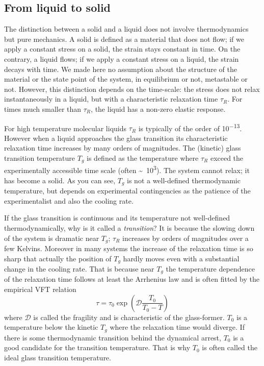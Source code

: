 \subsection{From liquid to solid}
\label{sec:liquid_solid}

The distinction between a solid and a liquid does not involve thermodynamics but pure mechanics. A solid is defined as a material that does not flow; if we apply a constant stress on a solid, the strain stays constant in time. On the contrary, a liquid flows; if we apply a constant stress on a liquid, the strain decays with time. We made here no assumption about the structure of the material or the state point of the system, in equilibrium or not, metastable or not. However, this distinction depends on the time-scale: the stress does not relax instantaneously in a liquid, but with a characteristic relaxation time $\tau_R$. For times much smaller than $\tau_R$, the liquid has a non-zero elastic response.

For high temperature molecular liquids $\tau_R$ is typically of the order of \unit{10^{-13}}{\second}. However when a liquid approaches the glass transition its characteristic relaxation time increases by many orders of magnitudes. The (kinetic) glass transition temperature $T_g$ is defined as the temperature where $\tau_R$ exceed the experimentally accessible time scale (often \unit{\sim 10^3}{\second}). The system cannot relax; it has become a solid. As you can see, $T_g$ is not a well-defined thermodynamic temperature, but depends on experimental contingencies as the patience of the experimentalist and also the cooling rate.

If the glass transition is continuous and its temperature not well-defined thermodynamically, why is it called a \emph{transition}? It is because the slowing down of the system is dramatic near $T_g$; $\tau_R$ increases by orders of magnitudes over a few Kelvins. Moreover in many systems the increase of the relaxation time is so sharp that actually the position of $T_g$ hardly moves even with a substantial change in the cooling rate. That is because near $T_g$ the temperature dependence of the relaxation time follows at least the Arrhenius law and is often fitted by the empirical \ac{VFT} relation~\citep{Vogel1921, Fulcher1925, Tammann1926}
\begin{equation}
	\tau = \tau_0 \exp{\left(\mathcal{D}\frac{T_0}{T_0-T}\right)}
	\label{eq:VFT}
\end{equation}
where $\mathcal{D}$ is called the fragility and is characteristic of the glass-former. $T_0$ is a temperature below the kinetic $T_g$ where the relaxation time would diverge. If there is some thermodynamic transition behind the dynamical arrest, $T_0$ is a good candidate for the transition temperature. That is why $T_0$ is often called the ideal glass transition temperature.

